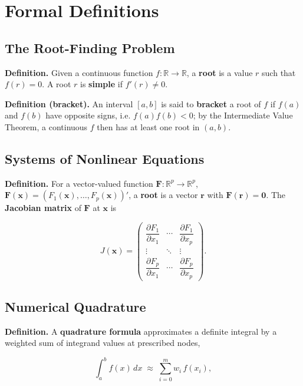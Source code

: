 \documentclass[
]{article}
\begin{document}
\section{Formal Definitions}\label{formal-definitions}

\subsection{The Root-Finding Problem}\label{the-root-finding-problem}

\textbf{Definition.} Given a continuous function \(f:\mathbb{R}\to
\mathbb{R}\), a \textbf{root} is a value \(r\) such that \(f(r)=0\). A
root \(r\) is \textbf{simple} if \(f'(r)\ne 0\).

\textbf{Definition (bracket).} An interval \([a,b]\) is said to
\textbf{bracket} a root of \(f\) if \(f(a)\) and \(f(b)\) have opposite
signs, i.e. \(f(a)f(b)<0\); by the Intermediate Value Theorem, a
continuous \(f\) then has at least one root in \((a,b)\).

\subsection{Systems of Nonlinear
Equations}\label{systems-of-nonlinear-equations}

\textbf{Definition.} For a vector-valued function
\(\mathbf F:\mathbb{R}^p\to\mathbb{R}^p\),
\(\mathbf F(\mathbf x) = (F_1(\mathbf x),\dots,F_p(\mathbf x))'\), a
\textbf{root} is a vector \(\mathbf r\) with \(\mathbf F(\mathbf r) =
\mathbf 0\). The \textbf{Jacobian matrix} of \(\mathbf F\) at
\(\mathbf x\) is

\[
J(\mathbf x) = \begin{pmatrix}
\dfrac{\partial F_1}{\partial x_1} & \cdots & \dfrac{\partial F_1}{\partial x_p} \\
\vdots & \ddots & \vdots \\
\dfrac{\partial F_p}{\partial x_1} & \cdots & \dfrac{\partial F_p}{\partial x_p}
\end{pmatrix}.
\tag{2.1}
\]

\subsection{Numerical Quadrature}\label{numerical-quadrature}

\textbf{Definition.} A \textbf{quadrature formula} approximates a
definite integral by a weighted sum of integrand values at prescribed
nodes,

\[
\int_a^b f(x)\,dx \;\approx\; \sum_{i=0}^{m} w_i\, f(x_i),
\tag{2.2}
\]
\end{document}
